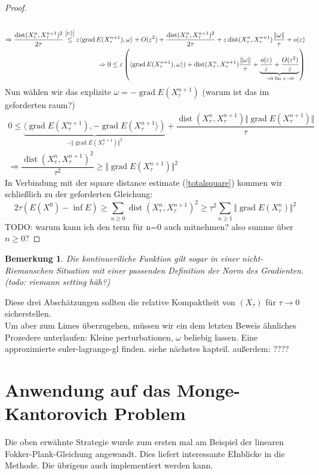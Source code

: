 \documentclass[11pt,a4paper,notitlepage]{scrreprt}
\newcommand{\dist}{\operatorname{dist}}
\newcommand{\grad}{\operatorname{grad}}
\newtheorem{bem}[defi]{Bemerkung}
\begin{document}
\begin{proof}
\begin{align*}
\\
\Rightarrow \dfrac{\dist(X_\tau^n,X_\tau^{n+1})^2}{2\tau}\overset{\ref{c)}}{\leq} \varepsilon\langle \grad E(X_\tau^{n+1}),\omega\rangle+O(\varepsilon^2)+ \dfrac{\dist(X_\tau^n,X_\tau^{n+1})^2}{2\tau}+\varepsilon\dist(X_\tau^n,X_\tau^{n+1})\dfrac{\Vert \omega \Vert}{\tau} + o(\varepsilon)\\
\Rightarrow 0\leq \varepsilon \left(\langle \grad E(X_\tau^{n+1}),\omega\rangle)+\dist(X_\tau^n,X_\tau^{n+1})\dfrac{\Vert \omega \Vert}{\tau} +\underset{\to 0 \text{ für } \varepsilon \to 0} {\underbrace{\dfrac{o(\varepsilon)}{\varepsilon}+\dfrac{O(\varepsilon^2)}{\varepsilon}}} \right)
\end{align*}
Nun wählen wir das explizite $\omega=-\grad E(X_\tau^{n+1})$ (warum ist das im geforderten raum?)
\begin{align*}
0\leq \underset{-\Vert \grad E(X_\tau^{n+1}) \Vert^2}{\underbrace{\langle \grad E(X_\tau^{n+1}),-\grad E(X_\tau^{n+1}\rangle)}}+\dfrac{\dist(X_\tau^n,X_\tau^{n+1})\Vert \grad E(X_\tau^{n+1}) \Vert}{\tau}\\
\Rightarrow \dfrac{\dist(X_\tau^n,X_\tau^{n+1})^2}{\tau^2} \geq \Vert \grad E(X_\tau^{n+1}) \Vert^2
\end{align*}
In Verbindung mit der square distance estimate (\ref{totalsquare}) kommen wir schließlich zu der geforderten Gleichung:
\begin{equation}
 2\tau (E(X^0)-\inf E)\geq \sum_{n\geq 0} \dist(X_\tau^n,X_\tau^{n+1})^2 \geq \tau^2 \sum_{n\geq 1} \Vert \grad E(X_\tau^n)\Vert^2
\end{equation}
TODO: warum kann ich den term für n=0 auch mitnehmen? also summe über $n\geq 0$?
\end{proof}
\begin{bem}
Die kontinueriliche Funktion gilt sogar in einer nicht-Riemanschen Situation mit einer passenden Definition der Norm des Gradienten. (todo: riemann setting häh?) 
\end{bem}

Diese drei Abschätzungen sollten die relative Kompaktheit von $(X_\tau)$ für $\tau \to 0$ sicherstellen. \\
Um aber zum Limes überzugehen, müssen wir ein dem letzten Beweis ähnliches Prozedere unterlaufen: Kleine perturbationen, $\omega$ beliebig lassen. Eine approximierte euler-lagrange-gl finden. siehe nächstes kapteil. außerdem: ???? 
\section{Anwendung auf das Monge-Kantorovich Problem}
Die oben erwähnte Strategie wurde zum ersten mal am Beispiel der linearen Fokker-Plank-Gleichung angewandt. Dies liefert interessante EInblicke in die Methode. Die übrigens auch implementiert werden kann. \\
\end{document}
